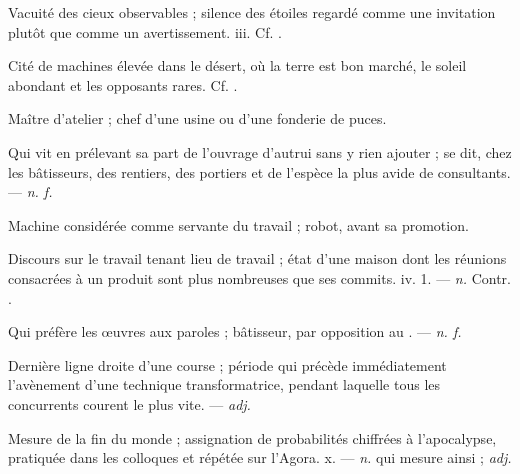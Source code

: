  Vacuité des cieux observables ; silence des étoiles regardé comme une invitation plutôt que comme un avertissement.   iii. Cf. .

 Cité de machines élevée dans le désert, où la terre est bon marché, le soleil abondant et les opposants rares.   Cf. .

 Maître d'atelier ; chef d'une usine ou d'une fonderie de puces.

  Qui vit en prélevant sa part de l'ouvrage d'autrui sans y rien ajouter ; se dit, chez les bâtisseurs, des rentiers, des portiers et de l'espèce la plus avide de consultants. ---  \textit{n. f.}

 Machine considérée comme servante du travail ; robot, avant sa promotion.

 Discours sur le travail tenant lieu de travail ; état d'une maison dont les réunions consacrées à un produit sont plus nombreuses que ses commits.   iv. 1. ---  \textit{n.} Contr. .

 Qui préfère les œuvres aux paroles ; bâtisseur, par opposition au . ---  \textit{n. f.}

 Dernière ligne droite d'une course ; période qui précède immédiatement l'avènement d'une technique transformatrice, pendant laquelle tous les concurrents courent le plus vite. ---  \textit{adj.}

 Mesure de la fin du monde ; assignation de probabilités chiffrées à l'apocalypse, pratiquée dans les colloques et répétée sur l'Agora.   x. ---  \textit{n.} qui mesure ainsi ;  \textit{adj.}

